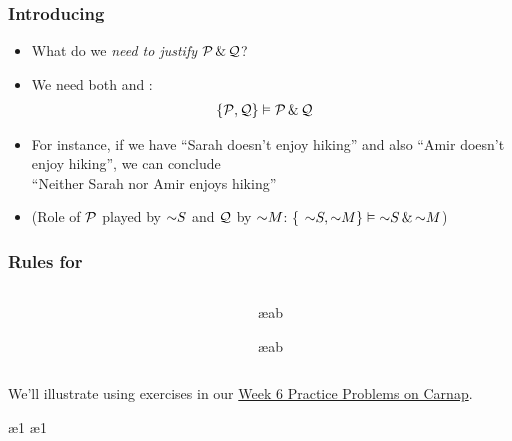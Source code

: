 \begin{frame}
  \frametitle{Introducing \eand}

  \begin{itemize}[<+->]
    \item What do we \emph{need to justify} $\mathcal{P} \,\&\, \mathcal{Q}$?
    \item We need both  and :
    \begin{align*}
      & \{ \mathcal{P}, \mathcal{Q} \} \vDash \mathcal{P}\,\&\, \mathcal{Q}
    \end{align*}
    \item For instance, if we have ``Sarah doesn't enjoy hiking'' and
    also ``Amir doesn't enjoy hiking'', we can conclude\\
    ``Neither
    Sarah nor Amir enjoys hiking''
    \item (Role of $\mathcal{P}$ played by $\enot S$ and $\mathcal{Q}$ by $\enot M$: \{ $\enot S, \enot M \} \entails \enot S \eand \enot M$)
  \end{itemize}
\end{frame}

\begin{frame}
  \frametitle{Rules for \eand}
  \begin{columns}
    \begin{column}{3cm}
  \begin{fitchproof}
     
  \end{fitchproof}
\end{column}
\begin{column}{3cm}
  \begin{fitchproof}
     \ae{ab}
  \end{fitchproof}
  \begin{fitchproof}
     \ae{ab}
  \end{fitchproof}
\end{column}
\end{columns}
We'll illustrate using exercises in our \href{https://tinyurl.com/2p82rpv5}{Week 6 Practice Problems on Carnap}.
\end{frame}

\begin{frame}
  \begin{fitchproof}
     \pr{}
    \ae{1}
    \ae{1}
  \end{fitchproof}
\end{frame}

